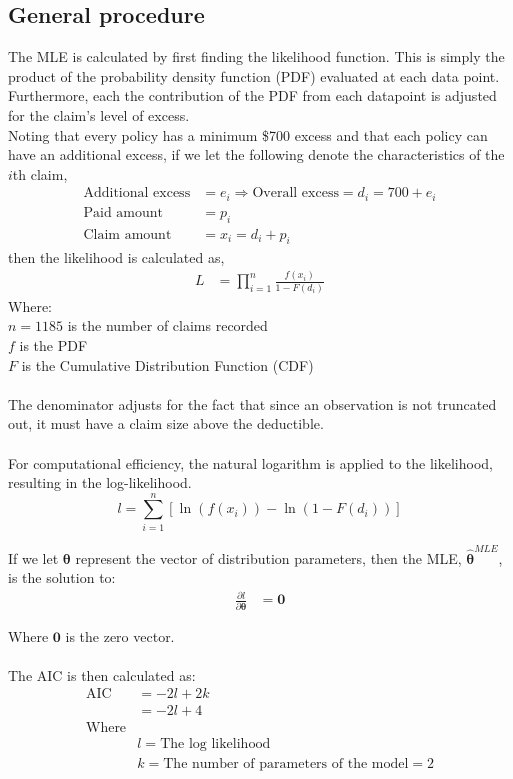 \documentclass[titlepage]{article}
\begin{document}
	\subsection{General procedure}
	The MLE is calculated by first finding the likelihood function. This is simply the product of the probability density function (PDF) evaluated at each data point. Furthermore, each the contribution of the PDF from each datapoint is adjusted for the claim's level of excess. \\
	Noting that every policy has a minimum \$700 excess and that each policy can have an additional excess, if we let the following denote the characteristics of the $i$th claim,	
	\begin{align*}
		\text{Additional excess} &= e_i \Rightarrow	\text{Overall excess} = d_i = 700 + e_i\\
		\text{Paid amount} &= p_i\\
		\text{Claim amount} &= x_i = d_i + p_i
	\end{align*}
	then the likelihood is calculated as,
	\begin{align*}
		L &= \prod_{i = 1}^{n}\frac{f(x_i)}{1-F(d_i)}
	\end{align*}
	Where:\\
	$n = 1185$ is the number of claims recorded\\
	$f$ is the PDF\\
	$F$ is the Cumulative Distribution Function (CDF)\\
	\\
	The denominator adjusts for the fact that since an observation is not truncated out, it must have a claim size above the deductible.\\
	\\
	For computational efficiency, the natural logarithm is applied to the likelihood, resulting in the log-likelihood.
	\begin{equation}
		l=\sum_{i=1}^{n}\left[\ln(f(x_i)) - \ln(1-F(d_i))\right] \label{loglik}
	\end{equation}

	If we let $\bm\theta$ represent the vector of distribution parameters, then the MLE, $\bm{\hat{\theta}}^{MLE}$, is the solution to:
	\begin{align*}
		\frac{\partial l}{\partial \bm{\theta}} &= \bm{0}
	\end{align*}

	Where $\bm 0$ is the zero vector.\\
	\\
	The AIC is then calculated as:
	\begin{align*}
		\text{AIC} &= -2l + 2k\\
		&= -2l + 4\\
		\text{Where}&\\
		&l= \text{The log likelihood}\\
		&k= \text{The number of parameters of the model}=2
	\end{align*}
	
\end{document}
